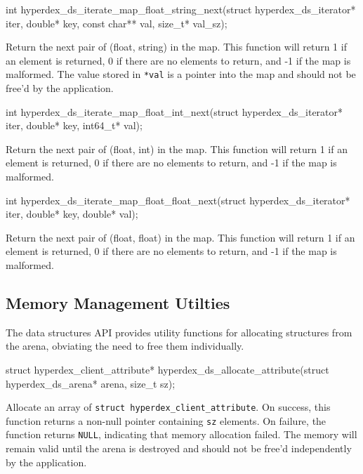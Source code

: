 \funcsep
\begin{ccode}
int hyperdex_ds_iterate_map_float_string_next(struct hyperdex_ds_iterator* iter,
                                              double* key,
                                              const char** val, size_t* val_sz);
\end{ccode}
\funcdesc Return the next pair of (float, string) in the map.  This function
will return 1 if an element is returned, 0 if there are no elements to return,
and -1 if the map is malformed.  The value stored in \texttt{*val} is a pointer
into the map and should not be free'd by the application.

\funcsep
\begin{ccode}
int hyperdex_ds_iterate_map_float_int_next(struct hyperdex_ds_iterator* iter,
                                           double* key, int64_t* val);
\end{ccode}
\funcdesc Return the next pair of (float, int) in the map.  This function will
return 1 if an element is returned, 0 if there are no elements to return, and -1
if the map is malformed.

\funcsep
\begin{ccode}
int hyperdex_ds_iterate_map_float_float_next(struct hyperdex_ds_iterator* iter,
                                             double* key, double* val);
\end{ccode}
\funcdesc Return the next pair of (float, float) in the map.  This function will
return 1 if an element is returned, 0 if there are no elements to return, and -1
if the map is malformed.

\subsection{Memory Management Utilties}

The data structures API provides utility functions for allocating structures
from the arena, obviating the need to free them individually.

\funcsep
\begin{ccode}
struct hyperdex_client_attribute*
hyperdex_ds_allocate_attribute(struct hyperdex_ds_arena* arena, size_t sz);
\end{ccode}
\funcdesc Allocate an array of \texttt{struct hyperdex\_client\_attribute}.
On success, this function returns a non-null pointer containing \texttt{sz}
elements.  On failure, the function returns \texttt{NULL}, indicating that
memory allocation failed.  The memory will remain valid until the arena is
destroyed and should not be free'd independently by the application.

